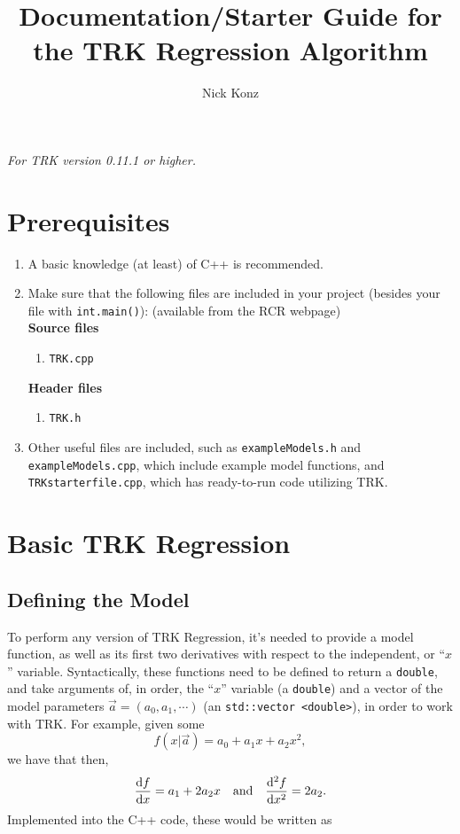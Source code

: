 \documentclass[12pt]{article}
\author{Nick Konz}
\title{Documentation/Starter Guide for the TRK Regression Algorithm}
\newcommand{\li}{\lstinline}
\begin{document}
	
\maketitle
\textit{For TRK version 0.11.1 or higher.}
\section*{Prerequisites}
\begin{enumerate}
	\item A basic knowledge (at least) of C++ is recommended.
	\item Make sure that the following files are included in your project (besides your file with \texttt{int.main()}): (available from the RCR webpage)
	\\\textbf{Source files}
	\begin{enumerate}
		\item \li{TRK.cpp}
	\end{enumerate}
	\textbf{Header files}
	\begin{enumerate}
		\item \li{TRK.h}
	\end{enumerate}
	\item Other useful files are included, such as \li{exampleModels.h} and \li{exampleModels.cpp}, which include example model functions, and \li{TRKstarterfile.cpp}, which has ready-to-run code utilizing TRK.
\end{enumerate}
\section{Basic TRK Regression}
\subsection{Defining the Model}
To perform any version of TRK Regression, it's needed to provide a model function, as well as its first two derivatives with respect to the independent, or ``$x$'' variable. Syntactically, these functions need to be defined to return a \li{double}, and take arguments of, in order, the ``$x$'' variable (a \li{double}) and a vector of the model parameters $\vec{a}=(a_0,a_1,\cdots)$ (an \li{std::vector <double>}), in order to work with TRK. For example, given some
\begin{equation}
    f(x|\vec{a}) = a_0 + a_1x + a_2x^2,
\end{equation}
we have that then,
\begin{equation}
    \dv{f}{x}=a_1 + 2a_2x \quad \text{and} \quad \dv[2]{f}{x}=2a_2.
\end{equation}
Implemented into the C++ code, these would be written as
\end{document}
